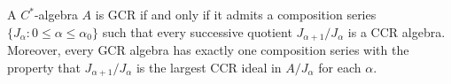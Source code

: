 A $C^*$-algebra $A$ is GCR if and only if it admits a composition series $\{J_\alpha : 0 \leqslant \alpha \leqslant \alpha_0\}$ such that every successive quotient $J_{\alpha+1}/J_\alpha$ is a CCR algebra. Moreover, every GCR algebra has exactly one composition series with the property that $J_{\alpha+1}/J_\alpha$ is the largest CCR ideal in $A/J_\alpha$ for each $\alpha$.
